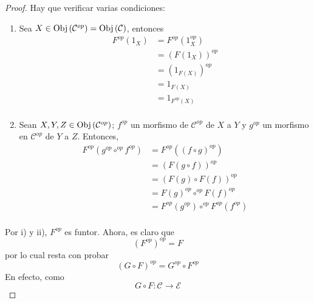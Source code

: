 \documentclass[12pt]{report}
\theoremstyle{largebreak}
\newcommand\cf[3]{\ensuremath{#1:#2\rightarrow#3}}
\newcommand{\Obj}[1]{\ensuremath{\textup{Obj}\left(#1\right)}}
\begin{document}
    \begin{proof}
        Hay que verificar varias condiciones:
        \renewcommand{\theenumi}{\roman{enumi}}
        \begin{enumerate}
            \item Sea $X\in\Obj{\mathcal{C}^{op}}=\Obj{\mathcal{C}}$, entonces
            \begin{equation*}
                \begin{split}
                    F^{op}(1_X)&=F^{op}(1_X^{op})\\
                    &=(F(1_X))^{op}\\
                    &=(1_{F(X)})^{op}\\
                    &=1_{F(X)}\\
                    &=1_{F^{op}(X)}\\
                \end{split}
            \end{equation*}
            \item Sean $X,Y,Z\in\Obj{\mathcal{C}^{op}}$; $f^{op}$ un morfismo de $\mathcal{C}^{op}$ de $X$ a $Y$ y $g^{op}$ un morfismo en $\mathcal{C}^{op}$ de $Y$ a $Z$. Entonces,
            \begin{equation*}
                \begin{split}
                    F^{op}(g^{op}\circ^{op}f^{op})&=F^{op}((f\circ g)^{op})\\
                    &=(F(g\circ f))^{op}\\
                    &=(F(g)\circ F(f))^{op}\\
                    &=F(g)^{op}\circ^{op}F(f)^{op}\\
                    &=F^{op}(g^{op})\circ^{op}F^{op}(f^{op})\\
                \end{split}
            \end{equation*}
        \end{enumerate}
        Por i) y ii), $F^{op}$ es funtor. Ahora, es claro que
        \begin{equation*}
            (F^{op})^{op}=F
        \end{equation*}
        por lo cual resta con probar
        \begin{equation*}
            (G\circ F)^{op}=G^{op}\circ F^{op}
        \end{equation*}
        En efecto, como
        \begin{equation*}
            \cf{G\circ F}{\mathcal{C}}{\mathcal{E}}

\end{equation*}
\end{proof}
\end{document}
